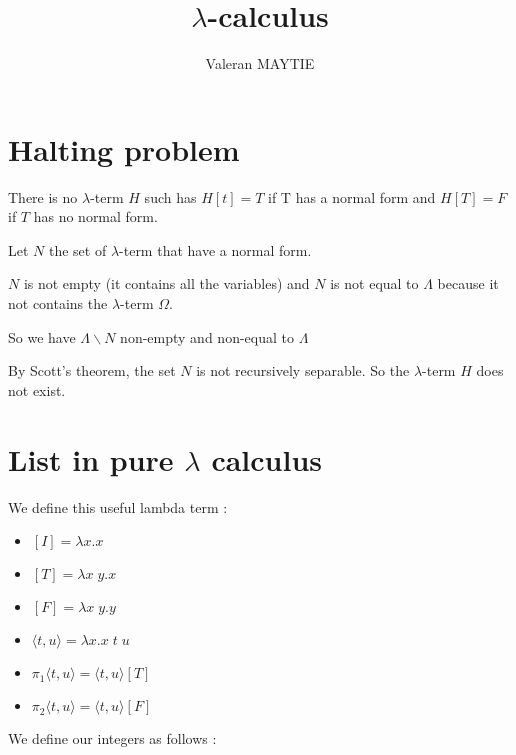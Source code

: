 \documentclass{article}
\date{}
\title{$\lambda$-calculus}
\author{Valeran MAYTIE}
\theoremstyle{plain}
\begin{document}
  \maketitle

  \section*{Halting problem}

  \begin{center}
    There is no $\lambda$-term $H$ such has $H[t] = T$ if T has a normal
    form and $H[T] = F$ if $T$ has no normal form.
  \end{center}

  Let $N$ the set of $\lambda$-term that have a normal form.

  $N$ is not empty (it contains all the variables) and $N$ is not equal to
  $\Lambda$ because it not contains the $\lambda$-term $\Omega$.

  So we have $\Lambda \backslash N$ non-empty and non-equal to $\Lambda$

  By Scott's theorem, the set $N$ is not recursively separable. So the
  $\lambda$-term $H$ does not exist.

  \section*{List in pure $\lambda$ calculus}

  We define this useful lambda term :

  \begin{multicols}{2}
    \begin{itemize}
      \item $[I] = \lambda x.x$
      \item $[T] = \lambda x\;y.x$
      \item $[F] = \lambda x\;y.y$
    \end{itemize}
    \columnbreak
    \begin{itemize}
      \item $\langle t, u \rangle = \lambda x. x\;t\;u$
      \item $\pi_1 \langle t, u \rangle = \langle t, u \rangle [T]$
      \item $\pi_2 \langle t, u \rangle = \langle t, u \rangle [F]$
    \end{itemize}
  \end{multicols}

  We define our integers as follows :
\end{document}

